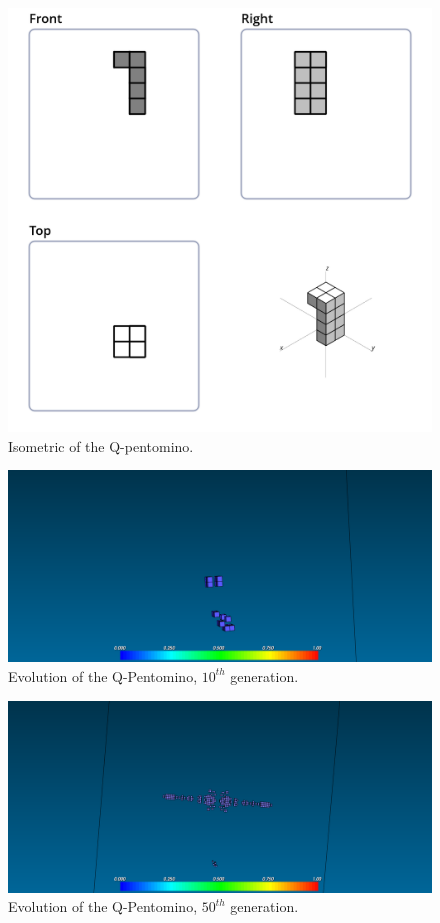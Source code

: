 \begin{figure}
	\centering
	\includegraphics[scale=0.3]{iso_diagrams/q.png}
	\caption{Isometric of the Q-pentomino.}
  \label{fig:iso-pent-q}
\end{figure}

\begin{figure}
	\centering
	\includegraphics[scale=0.3]{pentominoes_ss/q_10.png}
	\caption{Evolution of the Q-Pentomino, $10^{th}$ generation.}
  \label{fig:ss-pent:q-10}
\end{figure}

\begin{figure}
	\centering
	\includegraphics[scale=0.3]{pentominoes_ss/q_50.png}
	\caption{Evolution of the Q-Pentomino, $50^{th}$ generation.}
  \label{fig:ss-pent:q-50}
\end{figure}

